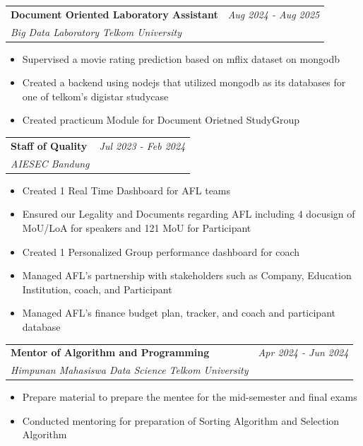 \documentclass[a4paper,11pt]{article}
\makeatletter
\newcommand{\resumeSubheading}[4]{
\vspace{0.5mm}\item
    \begin{tabular*}{0.98\textwidth}[t]{l@{\extracolsep{\fill}}r}
        \textbf{#1} & \textit{\footnotesize{#4}} \\
        \textit{\footnotesize{#3}} &  \footnotesize{#2}\\
    \end{tabular*}
    \vspace{-2.4mm}
}
\newcommand{\resumeItemListStart}{\begin{justify}\begin{itemize}[leftmargin=3ex, rightmargin=2ex, noitemsep,labelsep=1.2mm,itemsep=0mm]\small}
\newcommand{\resumeItemListEnd}{\end{itemize}\end{justify}\vspace{-2mm}}
\makeatother
\begin{document}
    \vspace{-3.0mm}

        \resumeSubheading
      {Document Oriented Laboratory Assistant}{}
      {Big Data Laboratory Telkom University}{Aug 2024 - Aug 2025}
      \vspace{-2.0mm}

      \resumeItemListStart
      \item{Supervised a movie rating prediction based on mflix dataset on mongodb}
      \item{Created a backend using nodejs that utilized mongodb as its databases for one of telkom's digistar studycase}
      \item {Created practicum Module for Document Orietned StudyGroup}
      \resumeItemListEnd

      \vspace{-3.0mm}

    \resumeSubheading
      {Staff of Quality}{}
      {AIESEC Bandung}{Jul 2023 - Feb 2024}
      \vspace{-2.0mm}
      
      \resumeItemListStart
    \item {Created 1 Real Time Dashboard for AFL teams}
    \item {Ensured our Legality and Documents regarding AFL including 4 docusign of MoU/LoA for speakers and 121 MoU for Participant}
    \item {Created 1 Personalized Group performance dashboard for coach}
    \item {Managed AFL's partnership with stakeholders such as Company, Education Institution, coach, and Participant}
    \item {Managed AFL's finance budget plan, tracker, and coach and participant database}
    \resumeItemListEnd
    
    \vspace{-3.0mm}

    \resumeSubheading
      {Mentor of Algorithm and Programming}{}
      {Himpunan Mahasiswa Data Science Telkom University}{Apr 2024 - Jun 2024}
      \vspace{-2.0mm}
      
      \resumeItemListStart
    \item {Prepare material to prepare the mentee for the mid-semester and final exams}
    \item {Conducted mentoring for preparation of Sorting Algorithm and Selection Algorithm}
    \resumeItemListEnd
    
\end{document}
